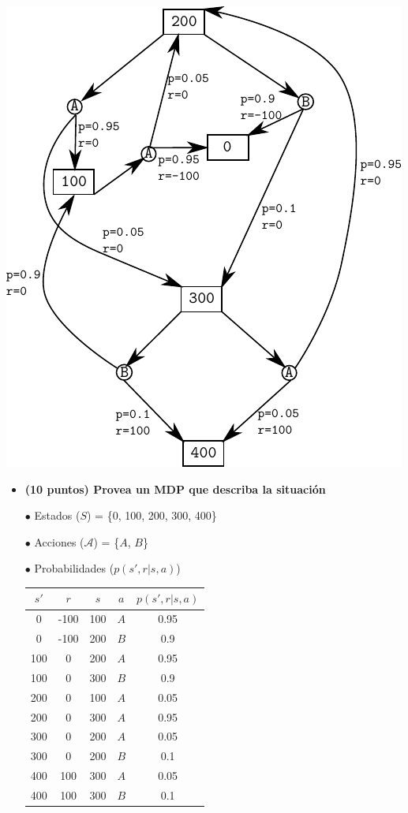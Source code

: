 \documentclass[a4paper,10pt]{article}
\begin{document}
\begin{enumerate}
\includegraphics[scale=1]{automata_casino}

    \begin{itemize}
	\item \textbf{(10 puntos) Provea un MDP que describa la situación}
	
	$\bullet$ Estados ($S$) = \{0, 100, 200, 300, 400\}
	
	$\bullet$ Acciones ($\mathcal{A}$) = \{$A$, $B$\}
	
	$\bullet$ Probabilidades ($p(s', r| s, a)$)
	
	\begin{tabular}{|c|c|c|c|c|}
	\hline
	$s'$ & $r$ & $s$ & $a$ & $p(s', r| s, a)$ \\ \hline
	0 & -100 & 100 & $A$ & 0.95 \\ \hline
	0 & -100 & 200 & $B$ & 0.9 \\ \hline
	100 & 0 & 200 & $A$ & 0.95 \\ \hline
	100 & 0 & 300 & $B$ & 0.9 \\ \hline
	200 & 0 & 100 & $A$ & 0.05 \\ \hline
	200 & 0 & 300 & $A$ & 0.95 \\ \hline
	300 & 0 & 200 & $A$ & 0.05 \\ \hline
	300 & 0 & 200 & $B$ & 0.1 \\ \hline
	400 & 100 & 300 & $A$ & 0.05 \\ \hline
	400 & 100 & 300 & $B$ & 0.1 \\ \hline
	\end{tabular}
	

\end{itemize}
\end{enumerate}
\end{document}
